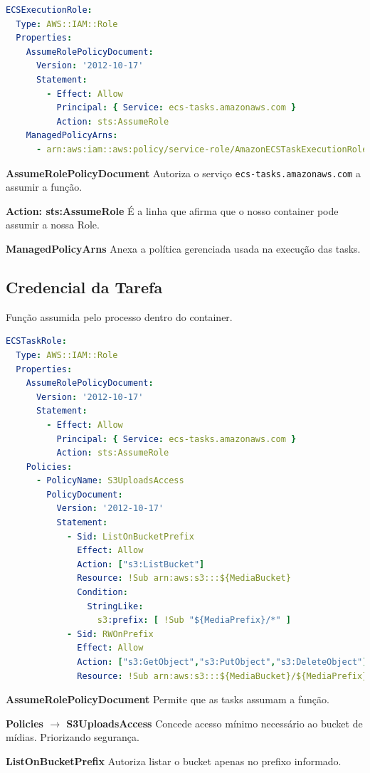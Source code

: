 \begin{lstlisting}[language=YAML]
ECSExecutionRole:
  Type: AWS::IAM::Role
  Properties:
    AssumeRolePolicyDocument:
      Version: '2012-10-17'
      Statement:
        - Effect: Allow
          Principal: { Service: ecs-tasks.amazonaws.com }
          Action: sts:AssumeRole
    ManagedPolicyArns:
      - arn:aws:iam::aws:policy/service-role/AmazonECSTaskExecutionRolePolicy
\end{lstlisting}

\textbf{AssumeRolePolicyDocument} Autoriza o serviço \texttt{ecs-tasks.amazonaws.com} a assumir a função.

\textbf{Action: sts:AssumeRole} É a linha que afirma que o nosso container pode assumir a nossa Role.

\textbf{ManagedPolicyArns} Anexa a política gerenciada usada na execução das tasks.


\subsection{Credencial da Tarefa}
Função assumida pelo processo dentro do container.

\begin{lstlisting}[language=YAML]
ECSTaskRole:
  Type: AWS::IAM::Role
  Properties:
    AssumeRolePolicyDocument:
      Version: '2012-10-17'
      Statement:
        - Effect: Allow
          Principal: { Service: ecs-tasks.amazonaws.com }
          Action: sts:AssumeRole
    Policies:
      - PolicyName: S3UploadsAccess
        PolicyDocument:
          Version: '2012-10-17'
          Statement:
            - Sid: ListOnBucketPrefix
              Effect: Allow
              Action: ["s3:ListBucket"]
              Resource: !Sub arn:aws:s3:::${MediaBucket}
              Condition:
                StringLike:
                  s3:prefix: [ !Sub "${MediaPrefix}/*" ]
            - Sid: RWOnPrefix
              Effect: Allow
              Action: ["s3:GetObject","s3:PutObject","s3:DeleteObject"]
              Resource: !Sub arn:aws:s3:::${MediaBucket}/${MediaPrefix}/*
\end{lstlisting}

\textbf{AssumeRolePolicyDocument} Permite que as tasks assumam a função.

\textbf{Policies \(\rightarrow\) S3UploadsAccess} Concede acesso mínimo necessário ao bucket de mídias. Priorizando segurança.

\textbf{ListOnBucketPrefix} Autoriza listar o bucket apenas no prefixo informado.

